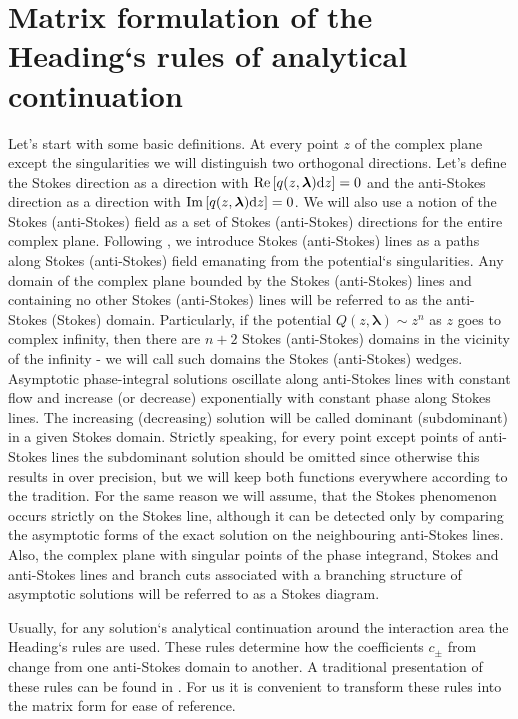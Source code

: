 \documentclass[12pt]{iopart}
\def\lmbd{\bm{\lambda}}
\def\Re{\mathrm{Re}}
\def\Im{\mathrm{Im}}
\newcommand\phsintgrnd[1][z]{q(#1,\lmbd)}
\begin{document}
\section{Matrix formulation of the Heading`s rules of analytical continuation \label{sec:mtrxfrm}}
Let's start with some basic definitions. At every point $z$ of the complex plane except the 
singularities we will distinguish two orthogonal directions. Let's define the Stokes direction 
as a direction with $\Re \left[ \phsintgrnd \rmd z \right]=0$ and the anti-Stokes direction 
as a direction with $\Im \left[ \phsintgrnd \rmd z \right]=0$. We will also use a notion of 
the Stokes (anti-Stokes) field as a set of Stokes (anti-Stokes) directions for the entire 
complex plane. Following \cite{heading, white}, we introduce Stokes (anti-Stokes) lines as a 
paths along Stokes (anti-Stokes) field emanating from the potential`s singularities. 
Any domain of the complex plane bounded by the Stokes (anti-Stokes) lines and containing no other 
Stokes (anti-Stokes) lines will be referred to as the anti-Stokes (Stokes) domain. Particularly, if 
the potential $Q(z,\lmbd) \sim z^n$ as $z$ goes to complex infinity, then there are $n+2$ Stokes 
(anti-Stokes) domains in the vicinity of the infinity - we will call such domains the Stokes 
(anti-Stokes) wedges. Asymptotic phase-integral solutions  oscillate along anti-Stokes 
lines with constant flow and increase (or decrease) exponentially with constant phase along Stokes lines. 
The increasing (decreasing) solution will be called dominant (subdominant) in a given Stokes domain. 
Strictly speaking, for every point except points of anti-Stokes lines the subdominant solution 
should be omitted since otherwise this results in over precision, but we will keep both functions 
everywhere according to the tradition. For the same reason we will assume, that the Stokes phenomenon 
occurs strictly on the Stokes line, although it can be detected only by comparing the asymptotic forms 
of the exact solution on the neighbouring anti-Stokes lines. Also, the complex plane with singular points
of the phase integrand, Stokes and anti-Stokes lines and branch cuts associated with a 
branching structure of asymptotic solutions  will be referred to as a Stokes diagram.

Usually, for any solution`s analytical continuation around the interaction area 
the Heading`s rules are used. These rules determine how the coefficients $c_\pm$ 
from  change from one anti-Stokes domain to another. A traditional presentation 
of these rules can be found in \cite{heading, white}. For us it is convenient to transform 
these rules into the matrix form for ease of reference.
\end{document}
